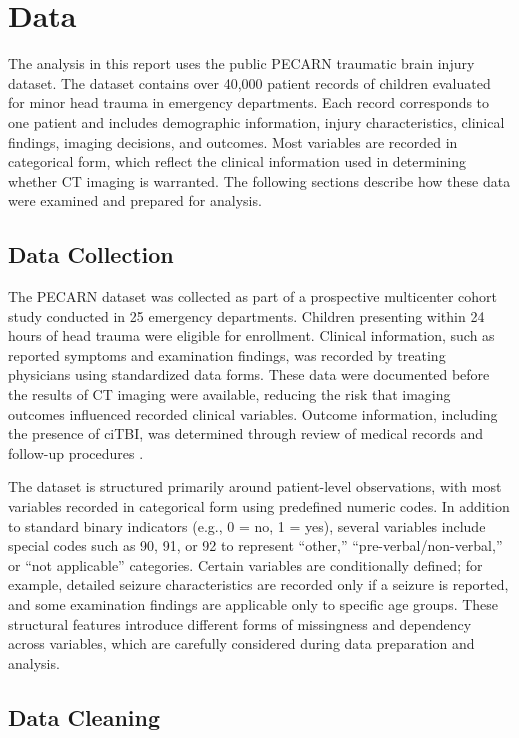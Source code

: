 \documentclass[11pt,letterpaper]{article}
\begin{document}
\section{Data}\label{data}

The analysis in this report uses the public PECARN traumatic brain injury dataset. The dataset contains over 40,000 patient records of children evaluated for minor head trauma in emergency departments. Each record corresponds to one patient and includes demographic information, injury characteristics, clinical findings, imaging decisions, and outcomes. Most variables are recorded in categorical form,  which reflect the clinical information used in determining whether CT imaging is warranted. The following sections describe how these data were examined and prepared for analysis.


\subsection{Data Collection}\label{data-collection}

The PECARN dataset was collected as part of a prospective multicenter cohort study conducted in 25 emergency departments. Children presenting within 24 hours of head trauma were eligible for enrollment. Clinical information, such as reported symptoms and examination findings, was recorded by treating physicians using standardized data forms. These data were documented before the results of CT imaging were available, reducing the risk that imaging outcomes influenced recorded clinical variables. Outcome information, including the presence of ciTBI, was determined through review of medical records and follow-up procedures \citep{kuppermann2009identification}.

The dataset is structured primarily around patient-level observations, with most variables recorded in categorical form using predefined numeric codes. In addition to standard binary indicators (e.g., 0 = no, 1 = yes), several variables include special codes such as 90, 91, or 92 to represent “other,” “pre-verbal/non-verbal,” or “not applicable” categories. Certain variables are conditionally defined; for example, detailed seizure characteristics are recorded only if a seizure is reported, and some examination findings are applicable only to specific age groups. These structural features introduce different forms of missingness and dependency across variables, which are carefully considered during data preparation and analysis.

\subsection{Data Cleaning}\label{data-cleaning}
\end{document}
